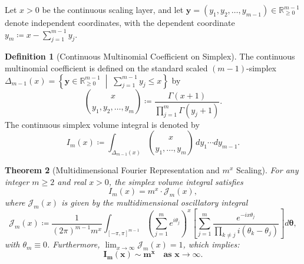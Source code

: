 \documentclass[11pt,a4paper]{article}
\theoremstyle{plain}
\newtheorem{theorem}{Theorem}[section]
\theoremstyle{definition}
\newtheorem{definition}[theorem]{Definition}
\theoremstyle{remark}
\numberwithin{equation}{section}
\begin{document}
Let $x > 0$ be the continuous scaling layer, and let $\mathbf{y} = (y_1, y_2, \dots, y_{m-1}) \in \mathbb{R}_{\ge 0}^{m-1}$ denote independent coordinates, with the dependent coordinate $y_m \coloneqq x - \sum_{j=1}^{m-1} y_j$.

\begin{definition}[Continuous Multinomial Coefficient on Simplex]
The continuous multinomial coefficient is defined on the standard scaled $(m-1)$-simplex $\Delta_{m-1}(x) = \left\{\mathbf{y} \in \mathbb{R}_{\ge 0}^{m-1} \;\middle|\; \sum_{j=1}^{m-1} y_j \le x\right\}$ by
\begin{equation}
\binom{x}{y_1, y_2, \dots, y_m} \coloneqq \frac{\Gamma(x+1)}{\prod_{j=1}^m \Gamma(y_j+1)}.
\end{equation}
The continuous simplex volume integral is denoted by
\begin{equation}
I_m(x) \coloneqq \int_{\Delta_{m-1}(x)} \binom{x}{y_1, \dots, y_m} \, dy_1 \cdots dy_{m-1}.
\end{equation}
\end{definition}

\begin{theorem}[Multidimensional Fourier Representation and $m^x$ Scaling]
\label{thm:simplex_integral}
For any integer $m \ge 2$ and real $x > 0$, the simplex volume integral satisfies
\begin{equation}
I_m(x) = m^x \cdot \mathcal{J}_m(x),
\end{equation}
where $\mathcal{J}_m(x)$ is given by the multidimensional oscillatory integral
\begin{equation}
\mathcal{J}_m(x) \coloneqq \frac{1}{(2\pi)^{m-1} m^x}\int_{[-\pi, \pi]^{m-1}} \left(\sum_{j=1}^m e^{i\theta_j}\right)^x \left[\sum_{j=1}^m \frac{e^{-ix\theta_j}}{\prod_{k \ne j} i(\theta_k - \theta_j)}\right] d\boldsymbol{\theta},
\end{equation}
with $\theta_m \equiv 0$. Furthermore, $\lim_{x\to\infty}\mathcal{J}_m(x) = 1$, which implies:
\begin{equation}
\mathbf{I_m(x) \sim m^x \quad \text{as } x \to \infty.}
\end{equation}
\end{theorem}
\end{document}
